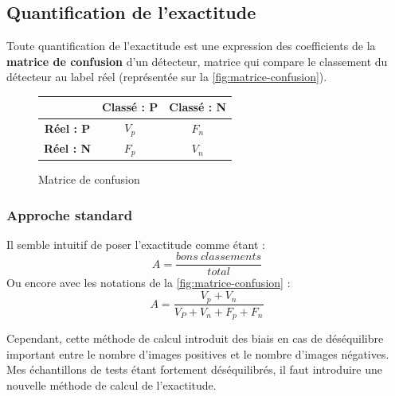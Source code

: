 \documentclass[12pt,a4paper]{article}
\begin{document}
\subsection{Quantification de l'exactitude}
Toute quantification de l'exactitude est une expression des coefficients de la \textbf{matrice de confusion} d'un détecteur, matrice qui compare le classement du détecteur au label réel (représentée sur la \autoref{fig:matrice-confusion}).

\begin{figure}
    \renewcommand{\arraystretch}{1.5}
    \begin{tabular}{|c|c|c|}
        \cline{2-3}
        \multicolumn{1}{c|}{} & \textbf{Classé : P} & \textbf{Classé : N} \\
        \hline
        \textbf{Réel : P} & $V_p$ & $F_n$ \\
        \hline
        \textbf{Réel : N} & $F_p$ & $V_n$ \\
        \hline
    \end{tabular}
    \caption{Matrice de confusion}
    \label{fig:matrice-confusion}
\end{figure}


\subsubsection{Approche standard}
Il semble intuitif de poser l'exactitude comme étant :
\[
    A = \frac{bons\ classements}{total} 
\]
Ou encore avec les notations de la \autoref{fig:matrice-confusion} :
\begin{equation}
    \boxed{A = \frac{V_p + V_n}{V_P + V_n + F_p + F_n}}
\end{equation}

Cependant, cette méthode de calcul introduit des biais en cas de déséquilibre important entre le nombre d'images positives et le nombre d'images négatives. Mes échantillons de tests étant fortement déséquilibrés, il faut introduire une nouvelle méthode de calcul de l'exactitude.
\end{document}
